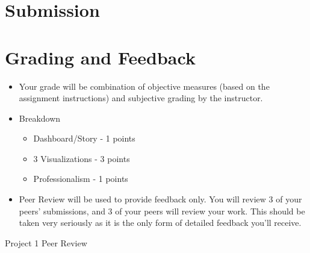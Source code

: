 \documentclass[a4paper,12pt]{article}
\begin{document}
\section{Submission}


\newpage
\section{Grading and Feedback}

\begin{itemize}

\item Your grade will be combination of objective measures (based on the assignment instructions) and subjective grading by the instructor.

\item Breakdown

\vspace{-5pt}
\begin{itemize}
\item Dashboard/Story - 1 points
\item 3 Visualizations - 3 points
\item Professionalism - 1 points
\end{itemize}

\item Peer Review will be used to provide feedback only. You will review 3 of your peers' submissions, and 3 of your peers will review your work. This should be taken very seriously as it is the only form of detailed feedback you'll receive.

\end{itemize}






\newpage

\begin{center}
{\huge Project 1 Peer Review}
\end{center}





\end{document}
